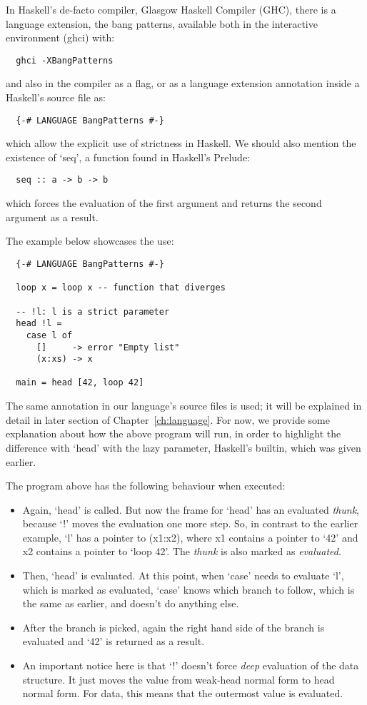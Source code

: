 \documentclass[diploma]{softlab-thesis}
\begin{document}
In Haskell's de-facto compiler, Glasgow Haskell Compiler (GHC), there is a language extension, the bang patterns, 
available both in the interactive environment (ghci) with:
\begin{verbatim}
  ghci -XBangPatterns
\end{verbatim}
and also in the compiler as a flag, or as a language extension annotation inside a Haskell's source file as:
\begin{verbatim}
  {-# LANGUAGE BangPatterns #-}
\end{verbatim}
which allow the explicit use of strictness in Haskell. We should also mention the existence of `seq', a function found
in Haskell's Prelude:
\begin{verbatim}
  seq :: a -> b -> b
\end{verbatim}
which forces the evaluation of the first argument and returns the second argument as a result.

The example below showcases the use:
\begin{verbatim}
  {-# LANGUAGE BangPatterns #-}

  loop x = loop x -- function that diverges

  -- !l: l is a strict parameter
  head !l = 
    case l of 
      []     -> error "Empty list"
      (x:xs) -> x

  main = head [42, loop 42]
\end{verbatim}

The same annotation in our language's source files is used; it will be explained in detail in later section of 
Chapter~\ref{ch:language}. For now, we provide some explanation about how the above program will run, in order to highlight 
the difference with `head' with the lazy parameter, Haskell's builtin, which was given earlier. 

The program above has the following behaviour when executed:
\begin{itemize}
  \item Again, `head' is called. But now the frame for `head' has an evaluated \textit{thunk}, because `!' moves the 
  evaluation one more step. So, in contrast to the earlier example, `l' has a pointer to (x1:x2), where x1 contains a pointer to 
  `42' and x2 contains a pointer to `loop 42'. The \textit{thunk} is also marked as \textit{evaluated}.
  \item Then, `head' is evaluated. At this point, when `case' needs to evaluate `l', which is marked as evaluated, `case' knows 
  which branch to follow, which is the same as earlier, and doesn't do anything else.
  \item After the branch is picked, again the right hand side of the branch is evaluated and `42' is returned as a result.
  \item An important notice here is that `!' doesn't force \textit{deep} evaluation of the data structure. It just moves the 
  value from weak-head normal form to head normal form. For data, this means that the outermost value is evaluated.
\end{itemize}
\end{document}
